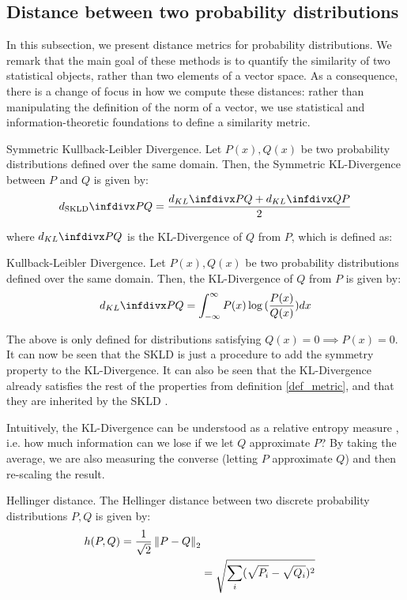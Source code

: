 \documentclass[../main.tex]{subfiles}
\begin{document}
\subsection{Distance between two probability distributions}\label{subsection_pdfdist}
In this subsection, we present distance metrics for probability distributions. We remark that the main goal of these methods is to quantify the similarity of two statistical objects, rather than two elements of a vector space. As a consequence, there is a change of focus in how we compute these distances: rather than manipulating the definition of the norm of a vector, we use statistical and information-theoretic foundations to define a similarity metric. 
\begin{definition}{Symmetric Kullback-Leibler Divergence.} \label{def_skld1}
Let $P(x), Q(x)$ be two probability distributions defined over the same domain. Then, the Symmetric KL-Divergence between $P$ and $Q$ is given by:
\begin{align*}
d_{\text{SKLD}}\infdiv{P}{Q} = \frac{d_{KL}\infdiv{P}{Q} + d_{KL}\infdiv{Q}{P}}{2}
\end{align*}
\end{definition}
\par where $d_{KL}\infdiv{P}{Q}$ is the KL-Divergence of $Q$ from $P$, which is defined as:
\begin{definition}{Kullback-Leibler Divergence.} \label{def_kld1}
Let $P(x), Q(x)$ be two probability distributions defined over the same domain. Then, the KL-Divergence of $Q$ from $P$ is given by:
\begin{align*}
d_{KL}\infdiv{P}{Q} = \int_{-\infty}^{\infty}P(x)\log{(\frac{P(x)}{Q(x)})}dx
\end{align*}
\end{definition}
\par The above is only defined for distributions satisfying $Q(x) = 0 \implies P(x) = 0$. It can now be seen that the SKLD is just a procedure to add the symmetry property to the KL-Divergence. It can also be seen that the KL-Divergence already satisfies the rest of the properties from definition \ref{def_metric}, and that they are inherited by the SKLD \cite{Hershey2007}. 
\par Intuitively, the KL-Divergence can be understood as a relative entropy measure \cite{Divergence2008}, i.e. how much information can we lose if we let $Q$ approximate $P$? By taking the average, we are also measuring the converse (letting $P$ approximate $Q$) and then re-scaling the result.
\begin{definition}{Hellinger distance.} \label{def_hellinger1}
The Hellinger distance between two discrete probability distributions $P, Q$ is given by:
\begin{align*}
h(P, Q) = \frac{1}{\sqrt{2}}\left\lVert P-Q\right\rVert_2\\
&= \sqrt{\sum_{i}(\sqrt{P_i}-\sqrt{Q_i})^2}
\end{align*}
\end{definition}
\end{document}
